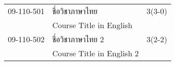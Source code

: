 \begin{longtable}{p{}p{}r{}}
09-110-501 & ชื่อวิชาภาษาไทย & 3(3-0)\\
& Course Title in English & \\[3mm]
09-110-502 & ชื่อวิชาภาษาไทย 2 & 3(2-2)\\
& Course Title in English 2 & \\[3mm]
\end{longtable}
